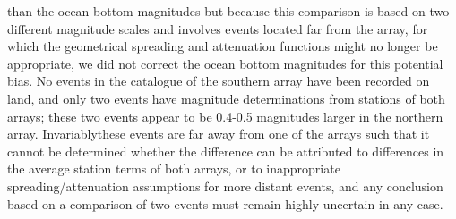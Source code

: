 \documentclass[reviewcopy]{elsart}
\providecommand{\DIFadd}[1]{{\protect\color{blue}\uwave{#1}}} %
\providecommand{\DIFdel}[1]{{\protect\color{red}\sout{#1}}}                      %
\providecommand{\DIFaddbegin}{} %
\providecommand{\DIFaddend}{} %
\providecommand{\DIFdelbegin}{} %
\providecommand{\DIFdelend}{} %
\begin{document}
than the ocean bottom magnitudes but because this comparison is based
on two different magnitude scales and involves  events located far
from the array, \DIFdelbegin \DIFdel{for which }\DIFdelend \DIFaddbegin \DIFadd{where }\DIFaddend the geometrical 
spreading and attenuation functions might no longer be appropriate, we
did not correct the ocean bottom magnitudes for this potential bias.
No events in the catalogue of the southern array  have been recorded
on land, and only two events have magnitude determinations from
stations of both arrays; these two events appear to be 0.4-0.5
magnitudes larger in the northern array.  Invariably\DIFaddbegin \DIFadd{, }\DIFaddend these events are
far away from one of the arrays such that it cannot be determined whether the
difference can be attributed to differences in the average station
terms of both arrays, or to inappropriate spreading/attenuation
assumptions for more distant events, and any conclusion based on a
comparison of \DIFaddbegin \DIFadd{just }\DIFaddend two events must remain highly uncertain in any case. 
\end{document}
